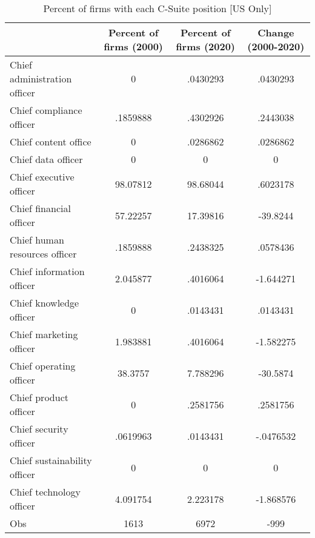 \begin{table}[htbp]\centering
\caption{Percent of firms with each C-Suite position [US Only]\label{tab98}}
\begin{tabular}{l*{3}{c}}
\toprule
                    &Percent of firms (2000)&Percent of firms (2020)&Change (2000-2020)\\
\midrule
Chief administration officer&           0&    .0430293&    .0430293\\
Chief compliance officer&    .1859888&    .4302926&    .2443038\\
Chief content office&           0&    .0286862&    .0286862\\
Chief data officer  &           0&           0&           0\\
Chief executive officer&    98.07812&    98.68044&    .6023178\\
Chief financial officer&    57.22257&    17.39816&    -39.8244\\
Chief human resources officer&    .1859888&    .2438325&    .0578436\\
Chief information officer&    2.045877&    .4016064&   -1.644271\\
Chief knowledge officer&           0&    .0143431&    .0143431\\
Chief marketing officer&    1.983881&    .4016064&   -1.582275\\
Chief operating officer&     38.3757&    7.788296&    -30.5874\\
Chief product officer&           0&    .2581756&    .2581756\\
Chief security officer&    .0619963&    .0143431&   -.0476532\\
Chief sustainability officer&           0&           0&           0\\
Chief technology officer&    4.091754&    2.223178&   -1.868576\\
Obs                 &        1613&        6972&        -999\\
\bottomrule
\end{tabular}
\end{table}
